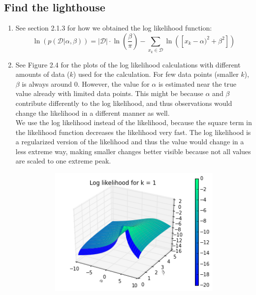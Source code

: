 \documentclass[a4paper,10pt]{article}
\numberwithin{equation}{section} %
\numberwithin{figure}{section} %
\numberwithin{table}{section} %
\theoremstyle{mytheor}
\begin{document}
\subsection{Find the lighthouse}
\begin{enumerate}
	\item See section 2.1.3 for how we obtained the log likelihood function: \begin{equation}
	\ln(p(\mathcal{D} | \alpha, \beta)) = \bigg \vert \mathcal{D}\bigg \vert \cdot \ln(\frac{\beta}{\pi}) - \sum_{x_k \in \mathcal{D}} \ln([x_k - \alpha)^2 + \beta^2]) \tag{2.18}
		\end{equation}
	\item See Figure 2.4 for the plots of the log likelihood calculations with different amounts of data ($k$) used for the calculation. For few data points (smaller $k$), $\beta$ is always around 0. However, the value for $\alpha$ is estimated near the true value already with limited data points. This might be because $\alpha$ and $\beta$ contribute differently to the log likelihood, and thus observations would change the likelihood in a different manner as well.\\
	We use the log likelihood instead of the likelihood, because the square term in the likelihood function decreases the likelihood very fast. The log likelihood is a regularized version of the likelihood and thus the value would change in a less extreme way, making smaller changes better visible because not all values are scaled to one extreme peak. 
		\begin{figure}[h!]
			\centering
			\begin{subfigure}[b]{0.45\textwidth}
				\includegraphics[width=\textwidth]{llhk1.png}

\end{subfigure}
\end{figure}
\end{enumerate}
\end{document}
